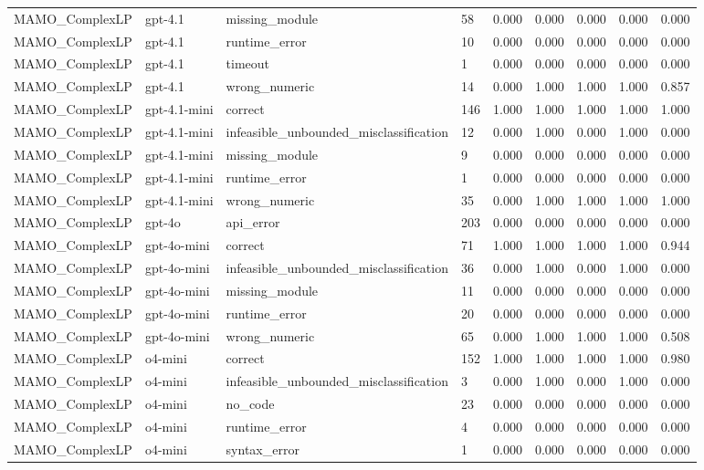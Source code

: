 \begin{table}[t]
\begin{tabular}{lllllllll}
MAMO\_ComplexLP & gpt-4.1 & missing\_module & 58 & 0.000 & 0.000 & 0.000 & 0.000 & 0.000 \\
MAMO\_ComplexLP & gpt-4.1 & runtime\_error & 10 & 0.000 & 0.000 & 0.000 & 0.000 & 0.000 \\
MAMO\_ComplexLP & gpt-4.1 & timeout & 1 & 0.000 & 0.000 & 0.000 & 0.000 & 0.000 \\
MAMO\_ComplexLP & gpt-4.1 & wrong\_numeric & 14 & 0.000 & 1.000 & 1.000 & 1.000 & 0.857 \\
MAMO\_ComplexLP & gpt-4.1-mini & correct & 146 & 1.000 & 1.000 & 1.000 & 1.000 & 1.000 \\
MAMO\_ComplexLP & gpt-4.1-mini & infeasible\_unbounded\_misclassification & 12 & 0.000 & 1.000 & 0.000 & 1.000 & 0.000 \\
MAMO\_ComplexLP & gpt-4.1-mini & missing\_module & 9 & 0.000 & 0.000 & 0.000 & 0.000 & 0.000 \\
MAMO\_ComplexLP & gpt-4.1-mini & runtime\_error & 1 & 0.000 & 0.000 & 0.000 & 0.000 & 0.000 \\
MAMO\_ComplexLP & gpt-4.1-mini & wrong\_numeric & 35 & 0.000 & 1.000 & 1.000 & 1.000 & 1.000 \\
MAMO\_ComplexLP & gpt-4o & api\_error & 203 & 0.000 & 0.000 & 0.000 & 0.000 & 0.000 \\
MAMO\_ComplexLP & gpt-4o-mini & correct & 71 & 1.000 & 1.000 & 1.000 & 1.000 & 0.944 \\
MAMO\_ComplexLP & gpt-4o-mini & infeasible\_unbounded\_misclassification & 36 & 0.000 & 1.000 & 0.000 & 1.000 & 0.000 \\
MAMO\_ComplexLP & gpt-4o-mini & missing\_module & 11 & 0.000 & 0.000 & 0.000 & 0.000 & 0.000 \\
MAMO\_ComplexLP & gpt-4o-mini & runtime\_error & 20 & 0.000 & 0.000 & 0.000 & 0.000 & 0.000 \\
MAMO\_ComplexLP & gpt-4o-mini & wrong\_numeric & 65 & 0.000 & 1.000 & 1.000 & 1.000 & 0.508 \\
MAMO\_ComplexLP & o4-mini & correct & 152 & 1.000 & 1.000 & 1.000 & 1.000 & 0.980 \\
MAMO\_ComplexLP & o4-mini & infeasible\_unbounded\_misclassification & 3 & 0.000 & 1.000 & 0.000 & 1.000 & 0.000 \\
MAMO\_ComplexLP & o4-mini & no\_code & 23 & 0.000 & 0.000 & 0.000 & 0.000 & 0.000 \\
MAMO\_ComplexLP & o4-mini & runtime\_error & 4 & 0.000 & 0.000 & 0.000 & 0.000 & 0.000 \\
MAMO\_ComplexLP & o4-mini & syntax\_error & 1 & 0.000 & 0.000 & 0.000 & 0.000 & 0.000 \\

\end{tabular}
\end{table}
